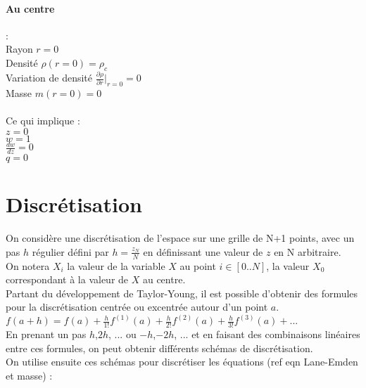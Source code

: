 \documentclass[a4paper,10pt]{article}
\begin{document}
\paragraph{Au centre}: \\
Rayon $r=0$ \\
Densité $\rho (r=0) = \rho_c$ \\
Variation de densité $\frac{\partial \rho}{\partial r}\vert_{r=0} = 0$ \\
Masse $m(r=0)=0$ \\
\\
Ce qui implique : \\
$z=0$ \\
$w=1$ \\
$\frac{dw}{dz}=0$ \\
$q=0$


\section{Discrétisation}
%
%

On considère une discrétisation de l'espace sur une grille de N+1 points, avec un pas $h$ régulier défini par $h=\frac{z_N}{N}$ en définissant une valeur de $z$  en N arbitraire.\\
On notera $X_i$ la valeur de la variable $X$ au point $i \in [0..N]$, la valeur $X_0$ correspondant à la valeur de $X$ au centre.\\
Partant du développement de Taylor-Young, il est possible d'obtenir des formules pour la discrétisation centrée ou excentrée autour d'un point $a$.\\
$f(a+h)=f(a)+\frac{h}{1!} f^{(1)} (a) + \frac{h}{2!} f^{(2)} (a) + \frac{h}{3!} f^{(3)} (a) + ...$\\
En prenant un pas $h$,$2h$, ... ou $-h$,$-2h$, ... et en faisant des combinaisons linéaires entre ces formules, on peut obtenir différents schémas de discrétisation.\\
On utilise ensuite ces schémas pour discrétiser les équations (ref eqn Lane-Emden et masse) :
\end{document}
